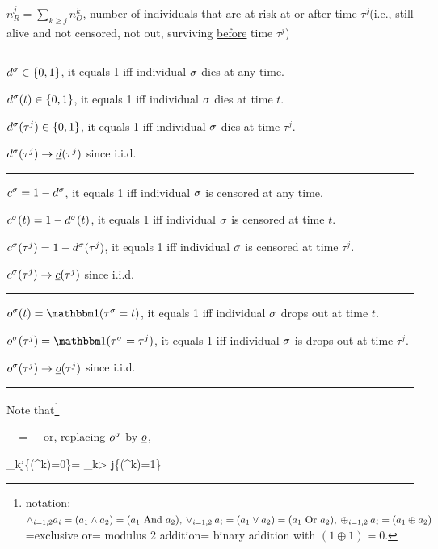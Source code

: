 $n_R^j=\sum_{k\geq j}n_O^k$, number of individuals
that are at risk \ul{at or after} time $\tau^j$(i.e.,  still alive
and not censored, not out, surviving \ul{before} time $\tau^j$)

\hrule
$d^\sigma\in\{0,1\}$, it equals 1 iff individual
$\sigma$ dies at any time.

$d^\sigma(t)\in\{0,1\}$, it  equals  1 iff individual
$\sigma$ dies at time $t$.

$d^\sigma(\tau^j)\in\{0,1\}$, it  equals  1 iff individual
$\sigma$ dies at time $\tau^j$.

$d^\s(\tau^j)\rarrow \rvd(\tau^j)$ since i.i.d.
\hrule
$c^\sigma=1-d^\sigma$, it equals 1 iff individual
$\sigma$ is censored  at any time.

$c^\sigma(t)=1-d^\sigma(t)$, it  equals  1 iff individual
$\sigma$ is censored at time $t$.

$c^\sigma(\tau^j)=1-d^\sigma(\tau^j)$, it  equals  1 iff individual
$\sigma$ is censored at time $\tau^j$.

$c^\s(\tau^j)\rarrow \rvc(\tau^j)$ since i.i.d.
\hrule

$o^\s(t)=\indi(\tau^\s = t)$, it  equals  1 iff individual
$\sigma$ drops out at time $t$.

$o^\s(\tau^j)=\indi(\tau^\s = \tau^j)$, it  equals  1 iff individual
$\sigma$ is drops out at time $\tau^j$.

$o^\s(\tau^j)\rarrow \rvo(\tau^j)$ since i.i.d.
\hrule
Note that\footnote{
notation: $
\wedge_{i=1,2}a_i = (a_1 \wedge a_2)= (a_1
\text{ And } a_2),\\
\vee_{i=1,2}a_i = (a_1 \vee  a_2 )= (a_1
\text{ Or } a_2),\\
\oplus_{i=1,2}a_i = (a_1 \oplus a_2)$ =exclusive or=
modulus 2 addition=
binary addition with $(1\oplus 1)=0$.}

\beq
{}_{ }=
_{ }
\eeq
or, replacing $o^\sigma$ by $\rvo$,

\beq
\bigA_{k\leq j}\{\rvo(\tau^k)=0\}=
\bigxor_{k> j}\{\rvo(\tau^k)=1\}
\eeq




